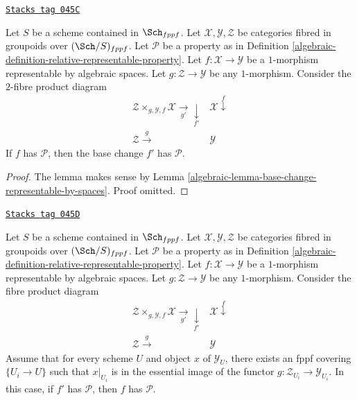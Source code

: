 \begin{lemma}
\label{algebraic-lemma-base-change-representable-transformations-property}
\href{https://stacks.math.columbia.edu/tag/045C}{\texttt{Stacks tag 045C}}

Let $S$ be a scheme contained in $\Sch_{fppf}$.
Let $\mathcal{X}, \mathcal{Y}, \mathcal{Z}$
be categories fibred in groupoids over $(\Sch/S)_{fppf}$.
Let $\mathcal{P}$ be a property as in
Definition \ref{algebraic-definition-relative-representable-property}.
Let $f : \mathcal{X} \to \mathcal{Y}$ be a $1$-morphism
representable by algebraic spaces.
Let $g : \mathcal{Z} \to \mathcal{Y}$ be any $1$-morphism.
Consider the $2$-fibre product diagram
$$
\begin{array}{cc}\mathcal{Z} \times_{g, \mathcal{Y}, f} \mathcal{X} \underset{g'}{\longrightarrow}\underset{f'}{\downarrow} & \mathcal{X} \overset{f}{\downarrow} \\ \mathcal{Z} \overset{g}{\longrightarrow} & \mathcal{Y}\end{array}
$$
If $f$ has $\mathcal{P}$, then the base change $f'$
has $\mathcal{P}$.
\end{lemma}

\begin{proof}

The lemma makes sense by
Lemma \ref{algebraic-lemma-base-change-representable-by-spaces}.
Proof omitted.
\end{proof}

\begin{lemma}
\label{algebraic-lemma-descent-representable-transformations-property}
\href{https://stacks.math.columbia.edu/tag/045D}{\texttt{Stacks tag 045D}}

Let $S$ be a scheme contained in $\Sch_{fppf}$.
Let $\mathcal{X}, \mathcal{Y}, \mathcal{Z}$
be categories fibred in groupoids over $(\Sch/S)_{fppf}$.
Let $\mathcal{P}$ be a property as in
Definition \ref{algebraic-definition-relative-representable-property}.
Let $f : \mathcal{X} \to \mathcal{Y}$ be a $1$-morphism
representable by algebraic spaces.
Let $g : \mathcal{Z} \to \mathcal{Y}$ be any $1$-morphism.
Consider the fibre product diagram
$$
\begin{array}{cc}\mathcal{Z} \times_{g, \mathcal{Y}, f} \mathcal{X} \underset{g'}{\longrightarrow}\underset{f'}{\downarrow} & \mathcal{X} \overset{f}{\downarrow} \\ \mathcal{Z} \overset{g}{\longrightarrow} & \mathcal{Y}\end{array}
$$
Assume that for every scheme $U$ and object $x$ of $\mathcal{Y}_U$,
there exists an fppf covering $\{U_i \to U\}$ such that $x|_{U_i}$
is in the essential image of the functor
$g : \mathcal{Z}_{U_i} \to \mathcal{Y}_{U_i}$.
In this case, if $f'$ has $\mathcal{P}$, then $f$ has $\mathcal{P}$.
\end{lemma}

